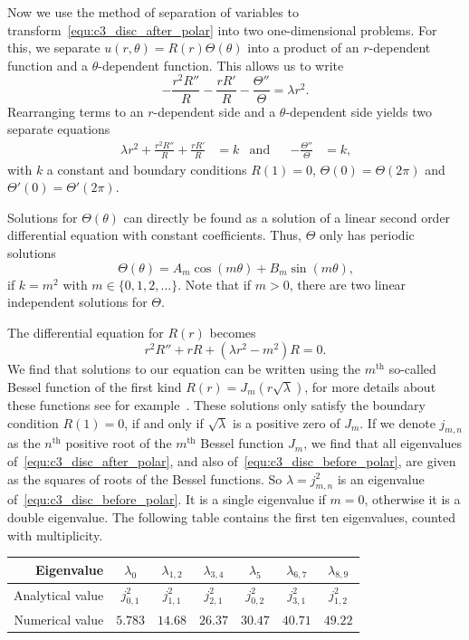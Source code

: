 Now we use the method of separation of variables to transform~\eqref{equ:c3_disc_after_polar} into two one-dimensional problems. For this, we separate $u(r, \theta) = R(r) \Theta(\theta)$ into a product of an $r$-dependent function and a $\theta$-dependent function. This allows us to write
$$
  -\frac{r^2 R''}{R} - \frac{rR'}{R} - \frac{\Theta''}{\Theta} = \lambda r^2 \text{.}
$$
Rearranging terms to an $r$-dependent side and a $\theta$-dependent side yields two separate equations
\begin{align*}
  \lambda r^2 + \frac{r^2 R''}{R} + \frac{rR'}{R} & = k & \text{and} &  & -\frac{\Theta''}{\Theta} & = k\text{,}
\end{align*}
with $k$ a constant and boundary conditions $R(1) = 0$, $\Theta(0) = \Theta(2\pi)$ and $\Theta'(0) = \Theta'(2\pi)$.

Solutions for $\Theta(\theta)$ can directly be found as a solution of a linear second order differential equation with constant coefficients. Thus, $\Theta$ only has periodic solutions
$$
  \Theta(\theta) = A_m \cos(m\theta) + B_m \sin(m\theta)\text{,}
$$
if $k = m^2$ with $m \in \{0, 1, 2, \dots\}$. Note that if $m > 0$, there are two linear independent solutions for $\Theta$.

The differential equation for $R(r)$ becomes
$$
  r^2 R'' + r R + (\lambda r^2 - m^2)R = 0\text{.}
$$
We find that solutions to our equation can be written using the $m^\text{th}$ so-called Bessel function of the first kind $R(r) = J_m(r \sqrt{\lambda})$, for more details about these functions see for example~\cite[section~4.7]{asmar_partial_2005}. These solutions only satisfy the boundary condition $R(1) = 0$, if and only if $\sqrt{\lambda}$ is a positive zero of $J_m$. If we denote $j_{m, n}$ as the $n^\text{th}$ positive root of the $m^\text{th}$ Bessel function $J_m$, we find that all eigenvalues of~\eqref{equ:c3_disc_after_polar}, and also of~\eqref{equ:c3_disc_before_polar}, are given as the squares of roots of the Bessel functions. So $\lambda = j_{m, n}^2$ is an eigenvalue of~\eqref{equ:c3_disc_before_polar}. It is a single eigenvalue if $m = 0$, otherwise it is a double eigenvalue. The following table contains the first ten eigenvalues, counted with multiplicity.

\begin{center}
  \bgroup
  \def\arraystretch{1.5}
  \begin{tabular}{r|cccccc}
    Eigenvalue       & $\lambda_0$ & $\lambda_{1,2}$ & $\lambda_{3,4}$ & $\lambda_{5}$ & $\lambda_{6,7}$ & $\lambda_{8,9}$ \\ \hline\hline
    Analytical value & $j_{0,1}^2$ & $j_{1,1}^2$     & $j_{2,1}^2$     & $j_{0,2}^2$   & $j_{3,1}^2$     & $j_{1,2}^2$     \\ \hline
    Numerical value  & $5.783$     & $14.68$         & $26.37$         & $30.47$       & $40.71$         & $49.22$
  \end{tabular}
  \egroup
\end{center}


